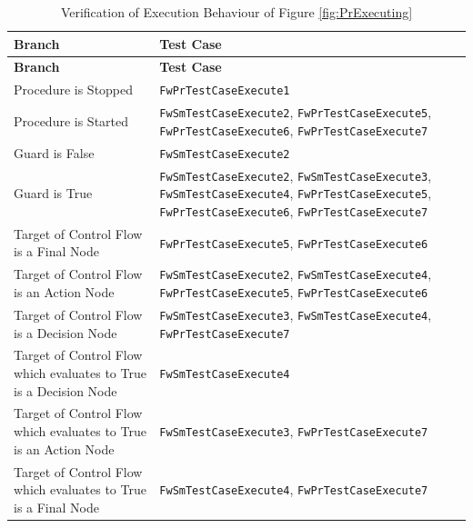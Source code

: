 \documentclass[requirements]{../fwprofile}
\begin{document}
\begin{longtable}{|p{6.7cm}|p{4.5cm}|}
\caption{Verification of Execution Behaviour of Figure \ref{fig:PrExecuting}}
\label{tab:PR_Exec} \\
\hline
\rowcolor{gray}
\textbf{Branch} & \textbf{Test Case} \\
\hline
\endfirsthead
\rowcolor{gray}
\textbf{Branch} & \textbf{Test Case} \\
\hline
\endhead
Procedure is Stopped & \texttt{FwPrTestCaseExecute1} \\
\hline
Procedure is Started & \texttt{FwSmTestCaseExecute2}, \texttt{FwPrTestCaseExecute5}, \texttt{FwPrTestCaseExecute6}, \texttt{FwPrTestCaseExecute7} \\
\hline
Guard is False & \texttt{FwSmTestCaseExecute2} \\
\hline
Guard is True & \texttt{FwSmTestCaseExecute2}, \texttt{FwSmTestCaseExecute3}, \texttt{FwSmTestCaseExecute4}, \texttt{FwPrTestCaseExecute5},
\texttt{FwPrTestCaseExecute6}, \texttt{FwPrTestCaseExecute7} \\
\hline
Target of Control Flow is a Final Node & \texttt{FwPrTestCaseExecute5}, \texttt{FwPrTestCaseExecute6} \\
\hline
Target of Control Flow is an Action Node & \texttt{FwSmTestCaseExecute2}, \texttt{FwSmTestCaseExecute4}, \texttt{FwPrTestCaseExecute5}, 
\texttt{FwPrTestCaseExecute6} \\
\hline
Target of Control Flow is a Decision Node & \texttt{FwSmTestCaseExecute3}, \texttt{FwSmTestCaseExecute4}, \texttt{FwPrTestCaseExecute7} \\
\hline
Target of Control Flow which evaluates to True is a Decision Node & \texttt{FwSmTestCaseExecute4} \\
\hline
Target of Control Flow which evaluates to True is an Action Node & \texttt{FwSmTestCaseExecute3}, \texttt{FwPrTestCaseExecute7} \\
\hline
Target of Control Flow which evaluates to True is a Final Node &  \texttt{FwSmTestCaseExecute4}, \texttt{FwPrTestCaseExecute7} \\
\hline
\end{longtable}


\end{document}

